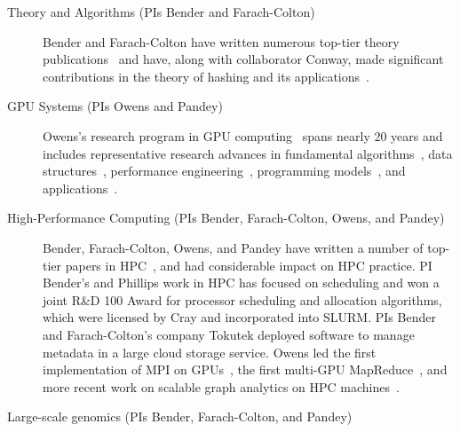 \begin{description}
  \item[Theory and Algorithms (PIs Bender and Farach-Colton)]
    Bender and Farach-Colton have written numerous
    top-tier theory
    publications~\cite{DBLP:conf/stoc/BenderFK19,DBLP:conf/focs/BenderFGJM018,DBLP:conf/soda/BenderCCFJT19,DBLP:conf/soda/AfshaniBFFGT17,DBLP:conf/pods/BenderFJMMPX17,DBLP:conf/stoc/BenderKPY16,DBLP:conf/soda/BenderFGKM17,DBLP:conf/pods/BenderBJKMPSSZ16}
    and have, along with collaborator Conway, made significant contributions in
    the theory of hashing and its
    applications~\cite{BenderFaGo18,BenderFaJo12,BenderFaJo11,PandeyBeJo17,PandeyAlBe18,PandeyBeJo18,PandeyBeJo17c,DBLP:conf/icalp/ConwayFS18}.


    \item[GPU Systems (PIs Owens and Pandey)] Owens's research program in GPU computing~\cite{Owens:2007:ASO,Owens:2008:GC} spans nearly 20 years and includes representative research advances in fundamental algorithms~\cite{Sengupta:2007:SPF}, data structures~\cite{Lefohn:2006:GGE,Alcantara:2009:RPH}, performance engineering~\cite{Zhang:2011:AQP}, programming models~\cite{Gupta:2012:ASO, Tzeng:2010:TMF}, and applications~\cite{Wang:2017:GGG}.

    \item[High-Performance Computing (PIs Bender, Farach-Colton, Owens, and
        Pandey)] Bender, Farach-Colton, Owens, and Pandey have
      written a number of top-tier papers in HPC~\cite{pandey2020timely,bender2017two,eckstein2015pebbl,agrawal1989four,bender2008communication,greenberg1999enabling},
      and had considerable impact on HPC practice.  PI Bender's and Phillips
      work in HPC has focused on scheduling and  won a joint R\&D 100 Award for
      processor scheduling and allocation algorithms, which were licensed by
      Cray and incorporated into SLURM.  PIs Bender and Farach-Colton's company
      Tokutek deployed software to manage metadata in a large cloud storage
      service. Owens led the first implementation of MPI on GPUs~\cite{Stuart:2009:MPO:withouturl,Stuart:2011:EMT}, the first multi-GPU MapReduce~\cite{Stuart:2011:MMO}, and more recent work on scalable graph analytics on HPC machines~\cite{Pan:2018:SBS,Pan:2017:MGA,Chen:2022:SIP}.

    \item[Large-scale genomics (PIs Bender, Farach-Colton, and Pandey)]

\end{description}


